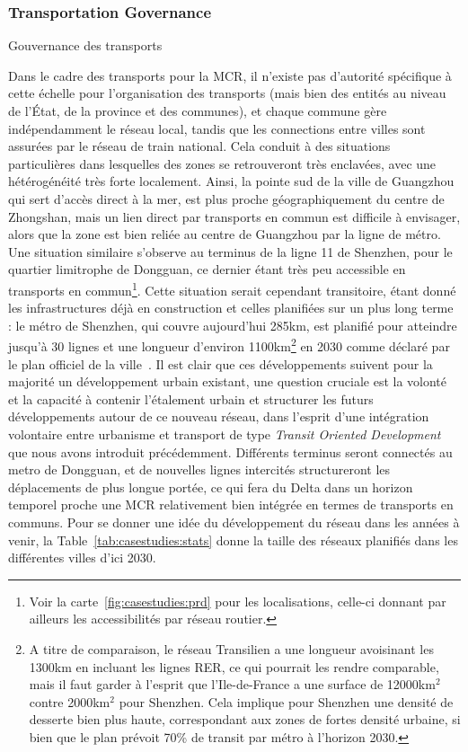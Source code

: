 \subsubsection{Transportation Governance}{Gouvernance des transports}

\bpar{}
{
 Dans le cadre des transports pour la MCR, il n'existe pas d'autorité spécifique à cette échelle pour l'organisation des transports (mais bien des entités au niveau de l'État, de la province et des communes), et chaque commune gère indépendamment le réseau local, tandis que les connections entre villes sont assurées par le réseau de train national. Cela conduit à des situations particulières dans lesquelles des zones se retrouveront très enclavées, avec une hétérogénéité très forte localement. Ainsi, la pointe sud de la ville de Guangzhou qui sert d'accès direct à la mer, est plus proche géographiquement du centre de Zhongshan, mais un lien direct par transports en commun est difficile à envisager, alors que la zone est bien reliée au centre de Guangzhou par la ligne de métro. Une situation similaire s'observe au terminus de la ligne 11 de Shenzhen, pour le quartier limitrophe de Dongguan, ce dernier étant très peu accessible en transports en commun\footnote{Voir la carte~\ref{fig:casestudies:prd} pour les localisations, celle-ci donnant par ailleurs les accessibilités par réseau routier.}. Cette situation serait cependant transitoire, étant donné les infrastructures déjà en construction et celles planifiées sur un plus long terme : le métro de Shenzhen, qui couvre aujourd'hui 285km, est planifié pour atteindre jusqu'à 30 lignes et une longueur d'environ 1100km\footnote{A titre de comparaison, le réseau Transilien a une longueur avoisinant les 1300km en incluant les lignes RER, ce qui pourrait les rendre comparable, mais il faut garder à l'esprit que l'Ile-de-France a une surface de 12000km$^2$ contre 2000km$^2$ pour Shenzhen. Cela implique pour Shenzhen une densité de desserte bien plus haute, correspondant aux zones de fortes densité urbaine, si bien que le plan prévoit 70\% de transit par métro à l'horizon 2030.} en 2030 comme déclaré par le plan officiel de la ville~\cite{shenzhen2016plan}. Il est clair que ces développements suivent pour la majorité un développement urbain existant, une question cruciale est la volonté et la capacité à contenir l'étalement urbain et structurer les futurs développements autour de ce nouveau réseau, dans l'esprit d'une intégration volontaire entre urbanisme et transport de type \emph{Transit Oriented Development} que nous avons introduit précédemment. Différents terminus seront connectés au metro de Dongguan, et de nouvelles lignes intercités structureront les déplacements de plus longue portée, ce qui fera du Delta dans un horizon temporel proche une MCR relativement bien intégrée en termes de transports en communs. Pour se donner une idée du développement du réseau dans les années à venir, la Table~\ref{tab:casestudies:stats} donne la taille des réseaux planifiés dans les différentes villes d'ici 2030.
}

